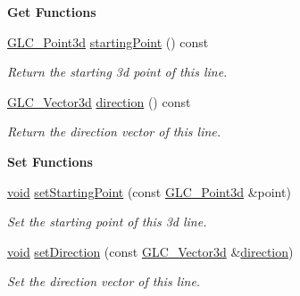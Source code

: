 \begin{Indent}{\bf Get Functions}\par
\begin{DoxyCompactItemize}
\item 
\hyperlink{glc__vector3d_8h_a4e13a9bbc7ab3d34de7e98b41836772c}{G\-L\-C\-\_\-\-Point3d} \hyperlink{class_g_l_c___line3d_a8b6122244cabc7ea8d9257e6bbda1718}{starting\-Point} () const 
\begin{DoxyCompactList}\small\item\em Return the starting 3d point of this line. \end{DoxyCompactList}\item 
\hyperlink{class_g_l_c___vector3d}{G\-L\-C\-\_\-\-Vector3d} \hyperlink{class_g_l_c___line3d_aeca82ac50ac08ebf817b29c28d272655}{direction} () const 
\begin{DoxyCompactList}\small\item\em Return the direction vector of this line. \end{DoxyCompactList}\end{DoxyCompactItemize}
\end{Indent}
\begin{Indent}{\bf Set Functions}\par
\begin{DoxyCompactItemize}
\item 
\hyperlink{group___u_a_v_objects_plugin_ga444cf2ff3f0ecbe028adce838d373f5c}{void} \hyperlink{class_g_l_c___line3d_adc20a48e19456f14a1a20e3b21914623}{set\-Starting\-Point} (const \hyperlink{glc__vector3d_8h_a4e13a9bbc7ab3d34de7e98b41836772c}{G\-L\-C\-\_\-\-Point3d} \&point)
\begin{DoxyCompactList}\small\item\em Set the starting point of this 3d line. \end{DoxyCompactList}\item 
\hyperlink{group___u_a_v_objects_plugin_ga444cf2ff3f0ecbe028adce838d373f5c}{void} \hyperlink{class_g_l_c___line3d_a8fd06e36e10ae91bd5e56c2ac9ff0441}{set\-Direction} (const \hyperlink{class_g_l_c___vector3d}{G\-L\-C\-\_\-\-Vector3d} \&\hyperlink{class_g_l_c___line3d_aeca82ac50ac08ebf817b29c28d272655}{direction})
\begin{DoxyCompactList}\small\item\em Set the direction vector of this line. \end{DoxyCompactList}\end{DoxyCompactItemize}
\end{Indent}


